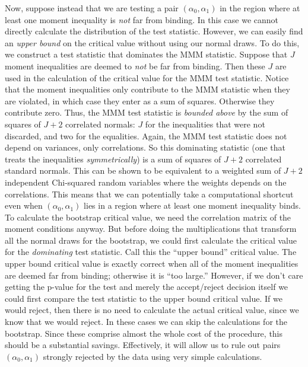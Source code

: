 \documentclass[12pt]{article}
\begin{document}
Now, suppose instead that we are testing a pair $(\alpha_0, \alpha_1)$ in the region where at least one moment inequality is \emph{not} far from binding.
In this case we cannot directly calculate the distribution of the test statistic.
However, we can easily find an \emph{upper bound} on the critical value without using our normal draws.
To do this, we construct a test statistic that dominates the MMM statistic.
Suppose that $J$ moment inequalities are deemed to \emph{not} be far from binding.
Then these $J$ are used in the calculation of the critical value for the MMM test statistic.
Notice that the moment inequalities only contribute to the MMM statistic when they are violated, in which case they enter as a sum of squares.
Otherwise they contribute zero.
Thus, the MMM test statistic is \emph{bounded above} by the sum of squares of $J+2$ correlated normals: $J$ for the inequalities that were not discarded, and two for the equalities.
Again, the MMM test statistic does not depend on variances, only correlations.
So this dominating statistic (one that treats the inequalities \emph{symmetrically}) is a sum of squares of $J+2$ correlated standard normals.
This can be shown to be equivalent to a weighted sum of $J+2$ independent Chi-squared random variables where the weights depends on the correlations.
This means that we can potentially take a computational shortcut even when $(\alpha_0,\alpha_1)$ lies in a region where at least one moment inequality binds.
To calculate the bootstrap critical value, we need the correlation matrix of the moment conditions anyway.
But before doing the multiplications that transform all the normal draws for the bootstrap, we could first calculate the critical value for the \emph{dominating} test statistic.
Call this the ``upper bound'' critical value.
The upper bound critical value is exactly correct when all of the moment inequalities are deemed far from binding; otherwise it is ``too large.''
However, if we don't care getting the p-value for the test and merely the accept/reject decision itself we could first compare the test statistic to the upper bound critical value.
If we would reject, then there is no need to calculate the actual critical value, since we know that we would reject.
In these cases we can skip the calculations for the bootstrap.
Since these comprise almost the whole cost of the procedure, this should be a substantial savings.
Effectively, it will allow us to rule out pairs $(\alpha_0, \alpha_1)$ strongly rejected by the data using very simple calculations.
\end{document}

